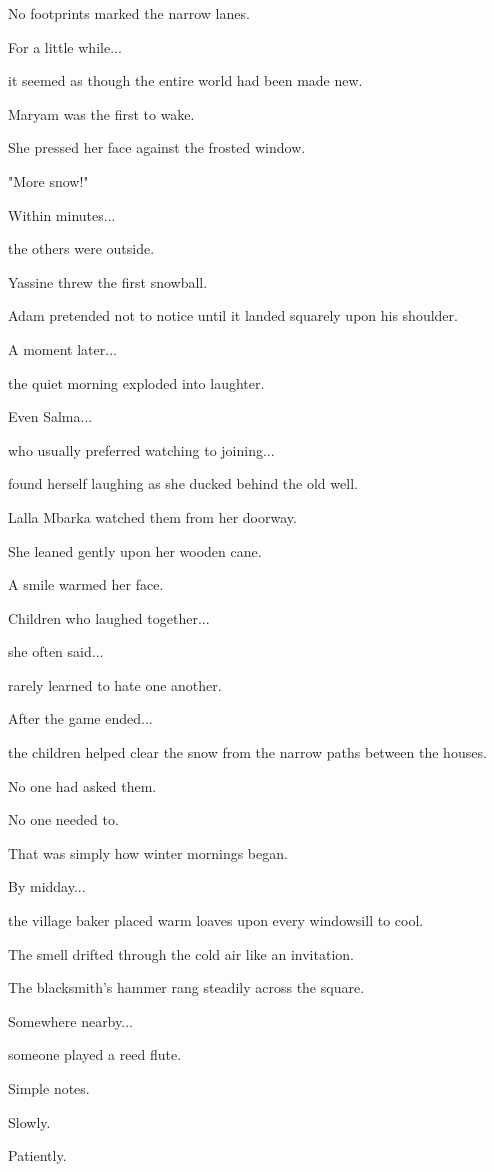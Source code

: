 \documentclass[12pt,openany]{book}
\begin{document}
No footprints marked the narrow lanes.

For a little while...

it seemed as though the entire world had been made new.

Maryam was the first to wake.

She pressed her face against the frosted window.

"More snow!"

Within minutes...

the others were outside.

Yassine threw the first snowball.

Adam pretended not to notice until it landed squarely upon his shoulder.

A moment later...

the quiet morning exploded into laughter.

Even Salma...

who usually preferred watching to joining...

found herself laughing as she ducked behind the old well.

Lalla Mbarka watched them from her doorway.

She leaned gently upon her wooden cane.

A smile warmed her face.

Children who laughed together...

she often said...

rarely learned to hate one another.

After the game ended...

the children helped clear the snow from the narrow paths between the houses.

No one had asked them.

No one needed to.

That was simply how winter mornings began.

By midday...

the village baker placed warm loaves upon every windowsill to cool.

The smell drifted through the cold air like an invitation.

The blacksmith's hammer rang steadily across the square.

Somewhere nearby...

someone played a reed flute.

Simple notes.

Slowly.

Patiently.
\end{document}
